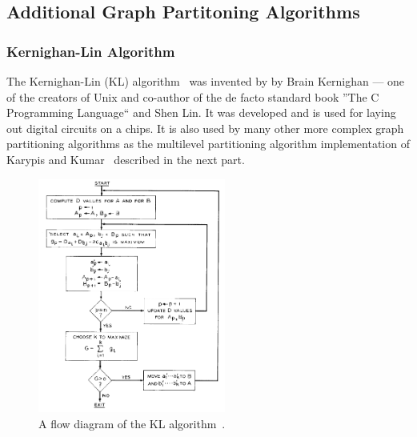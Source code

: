    \subsection{Additional Graph Partitoning Algorithms}
        \subsubsection*{Kernighan-Lin Algorithm}\label{kla}
            The Kernighan-Lin (KL) algorithm~\autocite{kl} was invented by by Brain Kernighan --- one of the creators of Unix and co-author of the de facto standard book ''The C Programming Language`` and  Shen Lin.
            It was developed and is used for laying out digital circuits on a chips. 
            It is also used by many other more complex graph partitioning algorithms as the multilevel partitioning algorithm implementation of Karypis and Kumar~\autocite{karypis} described in the next part.
            
            \begin{figure}[htp]
                \begin{center}
                    \includegraphics[keepaspectratio,width=0.55\textwidth]{img/03-graphs/kl.png}
                \end{center}
                \caption{A flow diagram of the KL algorithm~\autocite{kl}.} 
                \label{kl-fig}
            \end{figure}
                
